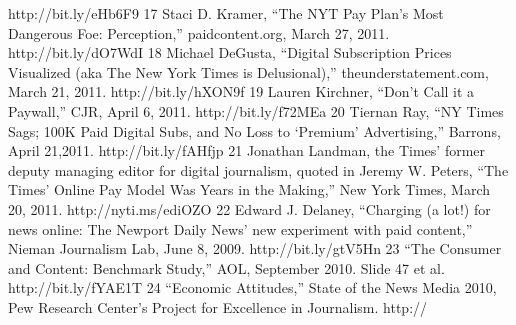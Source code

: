 http://bit.ly/eHb6F9
17 Staci D. Kramer, ``The NYT Pay Plan’s Most Dangerous Foe: Perception,'' paidcontent.org,
March 27, 2011. http://bit.ly/dO7WdI
18 Michael DeGusta, ``Digital Subscription Prices Visualized (aka The New York Times is
Delusional),'' theunderstatement.com, March 21, 2011. http://bit.ly/hXON9f
19 Lauren Kirchner, ``Don’t Call it a Paywall,'' CJR, April 6, 2011. http://bit.ly/f72MEa
20 Tiernan Ray, ``NY Times Sags; 100K Paid Digital Subs, and No Loss to ‘Premium’
Advertising,'' Barrons, April 21,2011. http://bit.ly/fAHfjp
21 Jonathan Landman, the Times’ former deputy managing editor for digital journalism, quoted in
Jeremy W. Peters, ``The Times’ Online Pay Model Was Years in the Making,'' New York Times,
March 20, 2011. http://nyti.ms/ediOZO
22 Edward J. Delaney, ``Charging (a lot!) for news online: The Newport Daily News’ new
experiment with paid content,'' Nieman Journalism Lab, June 8, 2009. http://bit.ly/gtV5Hn
23 ``The Consumer and Content: Benchmark Study,'' AOL, September 2010. Slide 47 et al.
http://bit.ly/fYAE1T
24 ``Economic Attitudes,'' State of the News Media 2010, Pew Research Center’s Project for
Excellence in Journalism. http://


